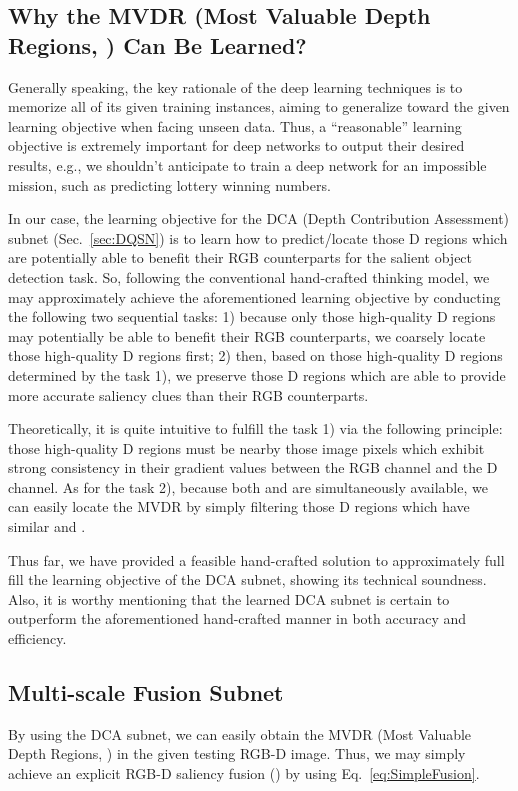 \documentclass[journal]{IEEEtran}
\begin{document}
\subsection{Why the MVDR (Most Valuable Depth Regions, ) Can Be Learned?}
Generally speaking, the key rationale of the deep learning techniques is to memorize all of its given training instances, aiming to generalize toward the given learning objective when facing unseen data.
Thus, a ``reasonable'' learning objective is extremely important for deep networks to output their desired results, e.g., we shouldn't anticipate to train a deep network for an impossible mission, such as predicting lottery winning numbers.

In our case, the learning objective for the DCA (Depth Contribution Assessment) subnet (Sec.~\ref{sec:DQSN}) is to learn how to predict/locate those D regions which are potentially able to benefit their RGB counterparts for the salient object detection task.
So, following the conventional hand-crafted thinking model, we may approximately achieve the aforementioned learning objective by conducting the following two sequential tasks:
1) because only those high-quality D regions may potentially be able to benefit their RGB counterparts, we coarsely locate those high-quality D regions first;
2) then, based on those high-quality D regions determined by the task 1), we preserve those D regions which are able to provide more accurate saliency clues than their RGB counterparts.

Theoretically, it is quite intuitive to fulfill the task 1) via the following principle:
those high-quality D regions must be nearby those image pixels which exhibit strong consistency in their gradient values between the RGB channel and the D channel.
As for the task 2), because both  and  are simultaneously available, we can easily locate the MVDR by simply filtering those D regions which have similar  and .

Thus far, we have provided a feasible hand-crafted solution to approximately full fill the learning objective of the DCA subnet, showing its technical soundness.
Also, it is worthy mentioning that the learned DCA subnet is certain to outperform the aforementioned hand-crafted manner in both accuracy and efficiency.

\subsection{Multi-scale Fusion Subnet}
\label{sec:MSDF}
By using the DCA subnet, we can easily obtain the MVDR (Most Valuable Depth Regions, ) in the given testing RGB-D image.
Thus, we may simply achieve an explicit RGB-D saliency fusion () by using Eq.~\ref{eq:SimpleFusion}.
\end{document}
